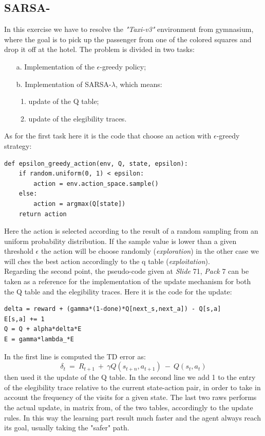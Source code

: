 \documentclass[10pt,a4paper]{article}
\begin{document}
\subsection{SARSA-\textlambda{}}
In this exercise we have to resolve the \textit{"Taxi-v3"} environment from gymnasium, where the goal is to pick up the passenger from one of the colored squares and drop it off at the hotel. The problem is divided in two tasks:
\begin{itemize}
    \item[a.] Implementation of the $\epsilon$-greedy policy;
    \item[b.] Implementation of SARSA-$\lambda$, which means:
    \begin{enumerate}
        \item update of the Q table;
        \item update of the elegibility traces.
    \end{enumerate}
\end{itemize}
\vspace{5pt}

\noindent As for the first task here it is the code that choose an action with $\epsilon$-greedy strategy:
\begin{lstlisting}
def epsilon_greedy_action(env, Q, state, epsilon):
    if random.uniform(0, 1) < epsilon:
        action = env.action_space.sample()  
    else:
        action = argmax(Q[state])
    return action
\end{lstlisting}
\vspace{5pt}

\noindent Here the action is selected according to the result of a random sampling from an uniform probability distribution. If the sample value is lower than a given threshold $\epsilon$ the action will be choose randomly (\textit{exploration}) in the other case we will ches the best action accordingly to the q table (\textit{exploitation}).\\

\noindent Regarding the second point, the pseudo-code given at \textit{Slide} 71, \textit{Pack} 7 can be taken as a reference for the implementation of the update mechanism for both the Q table and the elegibility traces. Here it is the code for the update:
\begin{lstlisting}
delta = reward + (gamma*(1-done)*Q[next_s,next_a]) - Q[s,a]
E[s,a] += 1
Q = Q + alpha*delta*E
E = gamma*lambda_*E
\end{lstlisting}
In the first line is computed the TD error as: 
\begin{equation}
    \delta_t  \:=\: R_{t+1} \:+\: \gamma Q(s_{t+n}, a_{t+1}) \:-\: Q(s_t, a_t)
\end{equation}
then used it the update of the Q table. In the second line we add 1 to the entry of the elegibility trace relative to the current state-action pair, in order to take in account the frequency of the visits for a given state. The last two raws performs the actual update, in matrix from, of the two tables, accordingly to the update rules. In this way the learning part result much faster and the agent always reach its goal, usually taking the "safer" path.
\newpage
\end{document}

